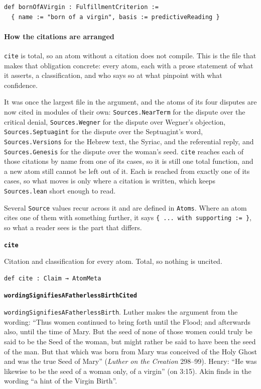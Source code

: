\documentclass[11pt]{article}
\begin{document}
{\small\begin{verbatim}
def bornOfAVirgin : FulfillmentCriterion :=
  { name := "born of a virgin", basis := predictiveReading }
\end{verbatim}}
\paragraph*{How the citations are arranged}
\leavevmode\par\nobreak
\texttt{cite} is total, so an atom without a citation does not compile. This is the file that makes that obligation concrete: every atom, each with a prose statement of what it asserts, a classification, and who says so at what pinpoint with what confidence.

It was once the largest file in the argument, and the atoms of its four disputes are now cited in modules of their own: \texttt{Sources.Near\allowbreak{}Term} for the dispute over the critical denial, \texttt{Sources.Wegner} for the dispute over Wegner’s objection, \texttt{Sources.Septuagint} for the dispute over the Septuagint’s word, \texttt{Sources.Versions} for the Hebrew text, the Syriac, and the referential reply, and \texttt{Sources.Genesis} for the dispute over the woman’s seed. \texttt{cite} reaches each of those citations by name from one of its cases, so it is still one total function, and a new atom still cannot be left out of it. Each is reached from exactly one of its cases, so what moves is only where a citation is written, which keeps \texttt{Sources.lean} short enough to read.

Several \texttt{Source} values recur across it and are defined in \texttt{Atoms}. Where an atom cites one of them with something further, it says \texttt{\{ ... with supporting := \}}, so what a reader sees is the part that differs.

\par\medskip\noindent\textbf{\texttt{cite}}\par\nobreak\noindent
Citation and classification for every atom. Total, so nothing is uncited.

{\small\begin{verbatim}
def cite : Claim → AtomMeta
\end{verbatim}}
\par\medskip\noindent\textbf{\texttt{wording\allowbreak{}Signifies\allowbreak{}AFatherless\allowbreak{}Birth\allowbreak{}Cited}}\par\nobreak\noindent
\texttt{wording\allowbreak{}Signifies\allowbreak{}AFatherless\allowbreak{}Birth}. Luther makes the argument from the wording: “Thus women continued to bring forth until the Flood; and afterwards also, until the time of Mary. But the seed of none of those women could truly be said to be the Seed of the woman, but might rather be said to have been the seed of the man. But that which was born from Mary was conceived of the Holy Ghost and was the true Seed of Mary” (\emph{Luther on the Creation} 298–99). Henry: “He was likewise to be the seed of a woman only, of a virgin” (on 3:15). Akin finds in the wording “a hint of the Virgin Birth”.
\end{document}
